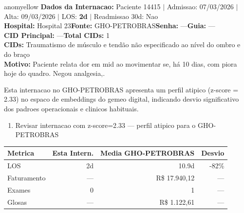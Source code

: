 \documentclass[a4paper,10pt]{article}
\begin{document}
\begin{anomalycard}[Internacao 168062 | GHO-PETROBRAS | MODERADO (z=2.33)]{anomyellow}
\textbf{Dados da Internacao:} Paciente 14415 $\mid$ Admissao: 07/03/2026 $\mid$ Alta: 09/03/2026 $\mid$ LOS: \textbf{2d} $\mid$ Readmissao 30d: Nao\\
\textbf{Hospital:} Hospital 23\quad\textbf{Fonte:} GHO-PETROBRAS\quad\textbf{Senha:} ---\quad\textbf{Guia:} ---\\
\textbf{CID Principal:} {\small ---}\quad\textbf{Total CIDs:} 1\\

\textbf{CIDs:} {\scriptsize Traumatismo de músculo e tendão não especificado ao nível do ombro e do braço}\\

\textbf{Motivo:} {\scriptsize Paciente relata dor em mid ao movimentar se, há 10 dias, com piora hoje do quadro. Negou analgesia,.}\\

\vspace{2pt}\begin{tcolorbox}[colback=severityred!20,colframe=anomyellow,title={\textbf{Interpretacao de Negocio}},fonttitle=\bfseries\small,left=4pt,right=4pt,top=3pt,bottom=3pt]
{\small Esta internacao no GHO-PETROBRAS apresenta um perfil atipico (z-score = 2.33) no espaco de embeddings do gemeo digital, indicando desvio significativo dos padroes operacionais e clinicos habituais.}
\end{tcolorbox}
\begin{tcolorbox}[colback=severityyellow!30,colframe=anomorange,title={\textbf{Recomendacoes Especificas}},fonttitle=\bfseries\small,left=4pt,right=4pt,top=3pt,bottom=3pt]
\begin{enumerate}[nosep,leftmargin=16pt]
\item {\small Revisar internacao com z-score=2.33 --- perfil atipico para o GHO-PETROBRAS}
\end{enumerate}
\end{tcolorbox}
\begin{center}\begin{tabular}{l r r r}\toprule\textbf{Metrica} & \textbf{Esta Intern.} & \textbf{Media GHO-PETROBRAS} & \textbf{Desvio} \\\midrule
LOS & 2d & 10.9d & -82\% \\
Faturamento & --- & R\$ 17.940,12 & --- \\
Exames & 0 & 1 & --- \\
Glosas & --- & R\$ 1.122,61 & --- \\
\bottomrule\end{tabular}\end{center}


\end{anomalycard}
\end{document}
